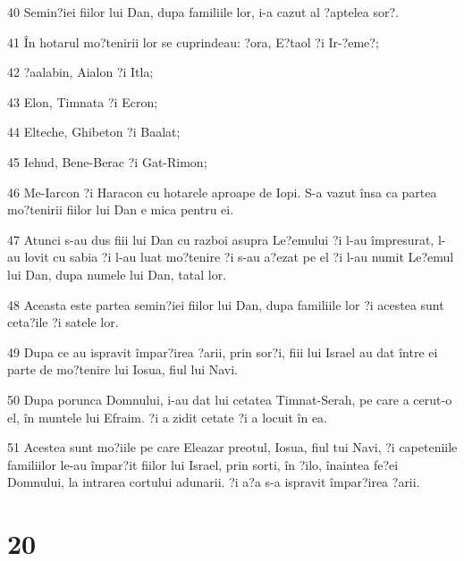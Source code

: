 \par 40 Semin?iei fiilor lui Dan, dupa familiile lor, i-a cazut al ?aptelea sor?.
\par 41 În hotarul mo?tenirii lor se cuprindeau: ?ora, E?taol ?i Ir-?eme?;
\par 42 ?aalabin, Aialon ?i Itla;
\par 43 Elon, Timnata ?i Ecron;
\par 44 Elteche, Ghibeton ?i Baalat;
\par 45 Iehud, Bene-Berac ?i Gat-Rimon;
\par 46 Me-Iarcon ?i Haracon cu hotarele aproape de Iopi. S-a vazut însa ca partea mo?tenirii fiilor lui Dan e mica pentru ei.
\par 47 Atunci s-au dus fiii lui Dan cu razboi asupra Le?emului ?i l-au împresurat, l-au lovit cu sabia ?i l-au luat mo?tenire ?i s-au a?ezat pe el ?i l-au numit Le?emul lui Dan, dupa numele lui Dan, tatal lor.
\par 48 Aceasta este partea semin?iei fiilor lui Dan, dupa familiile lor ?i acestea sunt ceta?ile ?i satele lor.
\par 49 Dupa ce au ispravit împar?irea ?arii, prin sor?i, fiii lui Israel au dat între ei parte de mo?tenire lui Iosua, fiul lui Navi.
\par 50 Dupa porunca Domnului, i-au dat lui cetatea Timnat-Serah, pe care a cerut-o el, în muntele lui Efraim. ?i a zidit cetate ?i a locuit în ea.
\par 51 Acestea sunt mo?iile pe care Eleazar preotul, Iosua, fiul tui Navi, ?i capeteniile familiilor le-au împar?it fiilor lui Israel, prin sorti, în ?ilo, înaintea fe?ei Domnului, la intrarea cortului adunarii. ?i a?a s-a ispravit împar?irea ?arii.

\chapter{20}

